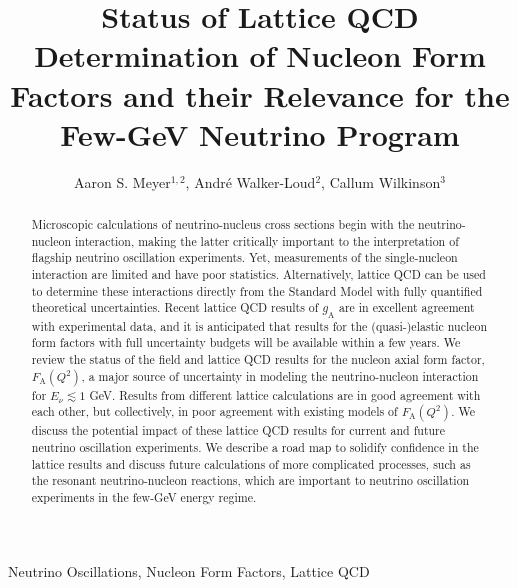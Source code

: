 \documentclass{ar-1col}
\begin{document}

\title{Status of Lattice QCD Determination of Nucleon Form Factors
 and their Relevance for the Few-GeV Neutrino Program}

\author{Aaron S. Meyer$^{1,2}$,
Andr\'{e} Walker-Loud$^2$,
Callum Wilkinson$^3$
}

\begin{abstract}
Microscopic calculations of neutrino-nucleus cross sections begin with the neutrino-nucleon interaction, making the latter critically important to the interpretation of flagship neutrino oscillation experiments.
Yet, measurements of the single-nucleon interaction are limited and have poor statistics.
Alternatively, lattice QCD can be used to determine these interactions directly from the Standard Model with fully quantified theoretical uncertainties.
Recent lattice QCD results of $g_{\mathrm{A}}$ are in excellent agreement with experimental data,
and it is anticipated that results for the (quasi-)elastic nucleon form factors with full uncertainty budgets will be available within a few years.
We review the status of the field and lattice QCD results for the nucleon axial form factor, $F_{\mathrm{A}}(Q^2)$, a major source of uncertainty in modeling the neutrino-nucleon interaction for $E_{\nu} \lesssim 1$ GeV.
Results from different lattice calculations are in good agreement with each other, but collectively, in poor agreement with existing models of $F_{\mathrm{A}}(Q^2)$.
We discuss the potential impact of these lattice QCD results for current and future neutrino oscillation experiments.
We describe a road map to solidify confidence in the lattice results and discuss future calculations of more complicated processes, such as the resonant neutrino-nucleon reactions, which are important
to neutrino oscillation experiments in the few-GeV energy regime.
\end{abstract}

\begin{keywords}
Neutrino Oscillations, Nucleon Form Factors, Lattice QCD
\end{keywords}
\end{document}

